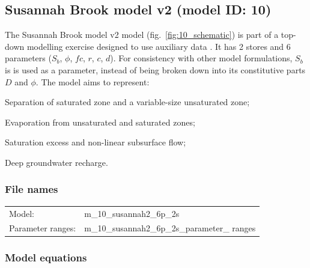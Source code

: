 \subsection{Susannah Brook model v2 (model ID: 10)}
The Susannah Brook model v2 model (fig.~\ref{fig:10_schematic}) is part of a top-down modelling exercise designed to use auxiliary data \citep{Son2007}. It has 2 stores and 6 parameters ($S_b$, $\phi$, $fc$, $r$, $c$, $d$). For consistency with other model formulations, $S_b$ is is used as a parameter, instead of being broken down into its constitutive parts $D$ and $\phi$. The model aims to represent:

\begin{itemizecompact}
\item Separation of saturated zone and a variable-size unsaturated zone;
\item Evaporation from unsaturated and saturated zones;
\item Saturation excess and non-linear subsurface flow;
\item Deep groundwater recharge.
\end{itemizecompact}

\subsubsection{File names}
\begin{tabular}{@{}ll}
Model: &m\_10\_susannah2\_6p\_2s \\
Parameter ranges: &m\_10\_susannah2\_6p\_2s\_parameter\_ ranges \\
\end{tabular}

\subsubsection{Model equations}

